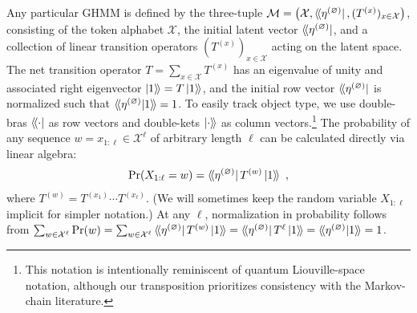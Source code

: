 \documentclass[prx,nofootinbib,onecolumn,showkeys,groupaddress,preprintnumbers,floatfix,
superscriptaddress]{revtex4-1}
\newcommand{\dbra}[1]{\bra{ \! \langle #1}}
\newcommand{\dket}[1]{\ket{ #1 \rangle \!}}
\newcommand{\dbraket}[1]{\braket{ \! \langle #1 \rangle \!}}
\newcommand{\init}{\dbra{\eta^{(\varnothing)}}}
\begin{document}
Any particular GHMM is defined by the three-tuple
$\mathcal{M} = \bigl( \mathcal{X} , \init , (T^{(x)})_{x \in \mathcal{X}} \bigr)$, 
consisting of the token alphabet $\mathcal{X}$, the initial latent vector $\init$, and a collection of linear transition operators $(T^{(x)})_{x \in \mathcal{X}}$ acting on the latent space.
The net transition operator $T = \sum_{x \in \mathcal{X}} T^{(x)}$ has an eigenvalue of unity and associated right eigenvector $\dket{1} = T \dket{1} $, and the initial row vector $\init$ is normalized such that $\dbraket{\eta^{(\varnothing)} | 1} = 1$.
To easily track object type, we use double-bras $\dbra{\cdot}$ as row vectors and double-kets $\dket{\cdot}$ as column vectors.\footnote{This notation is intentionally reminiscent of quantum Liouville-space notation, although our transposition prioritizes consistency with the Markov-chain literature.}
The probability of any sequence $w = x_{1:\ell} \in \mathcal{X}^\ell$ of arbitrary length $\ell$ 
can be 
calculated directly via linear algebra:
\begin{align}
	\Pr(X_{1:\ell} = w) = 
    \init T^{(w)} \dket{1}
    ~,
 \label{eq:Probs_from_GHMM}
\end{align}	
where $T^{(w)} = T^{(x_1)} \cdots T^{(x_\ell)} $.
(We will sometimes keep the random variable $X_{1:\ell}$ implicit for simpler notation.)
At any $\ell$, normalization in probability follows from 
$\sum_{w \in \mathcal{X}^\ell }	\Pr(w) 
=  \sum_{w \in \mathcal{X}^\ell } \init T^{(w)} \dket{1} 
=  \init T^\ell \dket{1} 
=   \dbraket{\eta^{(\varnothing)} | 1}  
= 1$.
%
\end{document}
